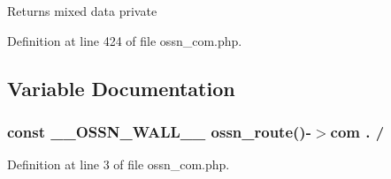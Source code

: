 \begin{DoxyReturn}{Returns}
mixed data  private 
\end{DoxyReturn}


Definition at line 424 of file ossn\+\_\+com.\+php.



\subsection{Variable Documentation}
\subsubsection[{\texorpdfstring{\+\_\+\+\_\+\+O\+S\+S\+N\+\_\+\+W\+A\+L\+L\+\_\+\+\_\+}{__OSSN_WALL__}}]{\setlength{\rightskip}{0pt plus 5cm}const \+\_\+\+\_\+\+O\+S\+S\+N\+\_\+\+W\+A\+L\+L\+\_\+\+\_\+ {\bf ossn\+\_\+route}()-\/$>$com . /\textquotesingle{}}\hypertarget{_ossn_wall_2ossn__com_8php_ac9cea97717788be69eb04b85091316d8}{}\label{_ossn_wall_2ossn__com_8php_ac9cea97717788be69eb04b85091316d8}


Definition at line 3 of file ossn\+\_\+com.\+php.

